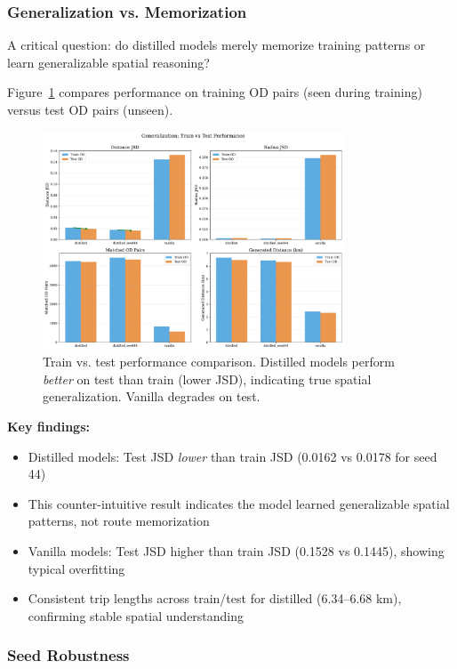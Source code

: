 \subsubsection{Generalization vs. Memorization}

A critical question: do distilled models merely memorize training patterns or learn generalizable spatial reasoning?

Figure~\ref{fig:train-test} compares performance on training OD pairs (seen during training) versus test OD pairs (unseen).

\begin{figure}[h]
\centering
\includegraphics[width=0.8\textwidth]{assets/plots/hoser/train_test_comparison.pdf}
\caption{Train vs. test performance comparison. Distilled models perform \emph{better} on test than train (lower JSD), indicating true spatial generalization. Vanilla degrades on test.}
\label{fig:train-test}
\end{figure}

\textbf{Key findings:}
\begin{itemize}[noitemsep,topsep=0pt]
\item Distilled models: Test JSD \emph{lower} than train JSD (0.0162 vs 0.0178 for seed 44)
\item This counter-intuitive result indicates the model learned generalizable spatial patterns, not route memorization
\item Vanilla models: Test JSD higher than train JSD (0.1528 vs 0.1445), showing typical overfitting
\item Consistent trip lengths across train/test for distilled (6.34--6.68 km), confirming stable spatial understanding
\end{itemize}

\subsubsection{Seed Robustness}

